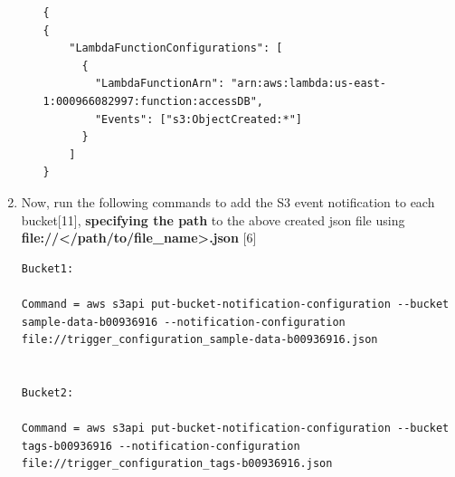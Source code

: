 \begin{enumerate}
\begin{enumerate}


\begin{mdframed}[linewidth=1pt]
\lstset{language=json}
\begin{lstlisting}
{
{
    "LambdaFunctionConfigurations": [
      {
        "LambdaFunctionArn": "arn:aws:lambda:us-east-1:000966082997:function:accessDB",
        "Events": ["s3:ObjectCreated:*"]
      }
    ]
}
\end{lstlisting}
\end{mdframed}
    \end{enumerate}

    \item Now, run the following commands to add the S3 event notification to each bucket[11], \textbf{specifying the path} to the above created json file using \textbf{file://\textless /path/to/file_name\textgreater.json} [6]




\begin{mdframed}[linewidth=1pt]
\lstset{language=PowerShell}
\begin{lstlisting}[basicstyle=\ttfamily\small, breaklines=true]
Bucket1:

Command = aws s3api put-bucket-notification-configuration --bucket sample-data-b00936916 --notification-configuration file://trigger_configuration_sample-data-b00936916.json


Bucket2:

Command = aws s3api put-bucket-notification-configuration --bucket tags-b00936916 --notification-configuration file://trigger_configuration_tags-b00936916.json
\end{lstlisting}
\end{mdframed}
    

\end{enumerate}

